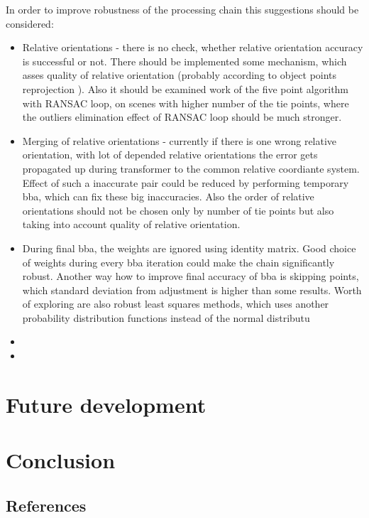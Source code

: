 \documentclass[a4paper,12pt]{report}
\begin{document}
In order to improve robustness of the processing chain this suggestions should be considered:
\begin{itemize}
\item Relative orientations - there is no check, whether relative orientation accuracy is successful or not. There 
should be implemented some mechanism, which asses quality of relative orientation (probably according to object points reprojection ).
Also it should be examined work of the five point algorithm with RANSAC loop, on scenes with higher number of the tie points, where 
the outliers elimination effect of RANSAC loop should be much stronger.
\item  Merging of relative orientations - currently if there is one wrong relative orientation, with lot of depended relative orientations  
the error gets propagated up during transformer to the common relative coordiante system. Effect of such a inaccurate pair could be 
reduced by performing  temporary bba, which can fix these big inaccuracies. Also the order of relative orientations should not 
be chosen only by number of tie points but also taking into account quality of relative orientation.
\item During final bba, the weights are ignored using identity matrix. Good choice of weights during every bba iteration 
could make the chain significantly robust. Another way how to improve final accuracy of bba is skipping points, which 
standard deviation from adjustment is higher than some results. Worth of exploring are also robust least squares methods,
which uses another probability distribution functions instead of the normal distributu

\item 
\item 
\end{itemize}



\chapter{Future development}




\chapter{Conclusion}

\section{References}

\end{document}
